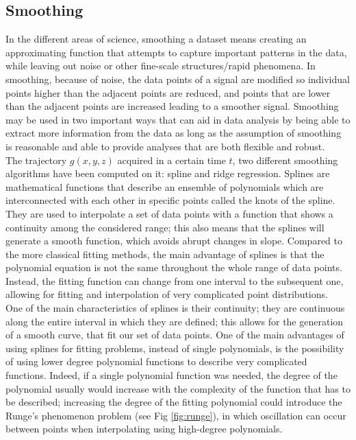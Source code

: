 \subsection{Smoothing}
\label{sec:smoothing}

In the different areas of science, smoothing a dataset means creating an approximating function that attempts to capture important patterns in the data, while leaving out noise or other fine-scale structures/rapid phenomena. In smoothing, because of noise, the data points of a signal are modified so individual points higher than the adjacent points are reduced, and points that are lower than the adjacent points are increased leading to a smoother signal. Smoothing may be used in two important ways that can aid in data analysis by being able to extract more information from the data as long as the assumption of smoothing is reasonable and able to provide analyses that are both flexible and robust. \\


\noindent The trajectory $g(x, y, z)$ acquired in a certain time $t$, two different smoothing algorithms have been computed on it: spline and ridge regression.
Splines are mathematical functions that describe an ensemble of polynomials which are interconnected with each other in specific points called the knots of the spline. They are used to interpolate a set of data points with a function that shows a continuity among the considered range; this also means that the splines will generate a smooth function, which avoids abrupt changes in slope. Compared to the more classical fitting methods, the main advantage of splines is that the polynomial equation is not the same throughout the whole range of data points. Instead, the fitting function can change from one interval to the subsequent one, allowing for fitting and interpolation of very complicated point distributions. \\

\noindent One of the main characteristics of splines is their continuity; they are continuous along the entire interval in which they are defined; this allows for the generation of a smooth curve, that fit our set of data points. One of the main advantages of using splines for fitting problems, instead of single polynomials, is the possibility of using lower degree polynomial functions to describe very complicated functions. Indeed, if a single polynomial function was needed, the degree of the polynomial usually would increase with the complexity of the function that has to be described; increasing the degree of the fitting polynomial could introduce the Runge's phenomenon problem (see Fig \ref{fig:runge}), in which oscillation can occur between points when interpolating using high-degree polynomials. \\

